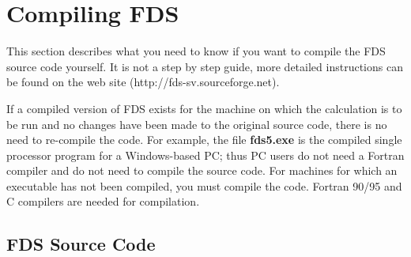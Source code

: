 \documentclass[11pt]{book}
\begin{document}



\appendix


\chapter{Compiling FDS}%
\label{info:compilation}

This section describes what you need to know if you want to compile the FDS source code yourself.
It is not a step by step guide, more detailed instructions can be found on the web site (http://fds-sv.sourceforge.net).

If a compiled version of FDS exists for the machine on which the
calculation is to be run and no changes have been made to
the original source code, there is no need to re-compile the code.
For example, the file {\bf fds5.exe} is the
compiled single processor program for a Windows-based PC;
thus PC users do not need a
Fortran compiler and do not need to compile the source code.
For machines for which an executable has not been compiled, you must
compile the code. Fortran 90/95 and C compilers are needed for compilation.

\section{FDS Source Code}
\end{document}
